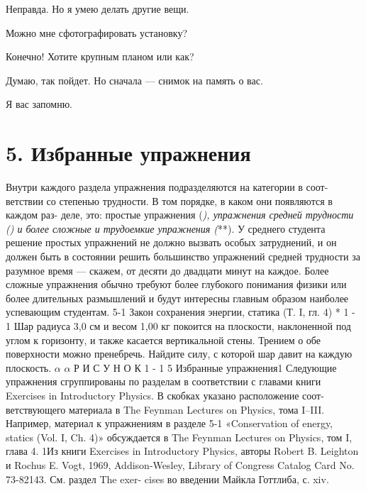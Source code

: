 \documentclass[11pt,oneside]{article}
\begin{document}
Неправда. Но я умею делать другие вещи.\par

Можно мне сфотографировать установку?\par

Конечно! Хотите крупным планом или как?\par

Думаю, так пойдет. Но сначала --- снимок на память о вас.\par

Я вас запомню.\par

\clearpage


\section*{5. Избранные упражнения}



\label{tips-sec-13-5-избранные-упражнения}


Внутри каждого раздела упражнения подразделяются на категории в соот- ветствии со степенью трудности. В том порядке, в каком они появляются в каждом раз- деле, это: простые упражнения (\emph{), упражнения средней трудности (}\emph{) и более сложные и трудоемкие упражнения (}**). У среднего студента решение простых упражнений не должно вызвать особых затруднений, и он должен быть в состоянии решить большинство упражнений средней трудности за разумное время --- скажем, от десяти до двадцати минут на каждое. Более сложные упражнения обычно требуют более глубокого понимания физики или более длительных размышлений и будут интересны главным образом наиболее успевающим студентам. 5-1 Закон сохранения энергии, статика (Т. I, гл. 4) * 1 - 1 Шар радиуса 3,0 см и весом 1,00 кг покоится на плоскости, наклоненной под углом к горизонту, и также касается вертикальной стены. Трением о обе поверхности можно пренебречь. Найдите силу, с которой шар давит на каждую плоскость. \(\alpha\) \(\alpha\) Р И С У Н О К  1 - 1 5 Избранные упражнения1 Следующие упражнения сгруппированы по разделам в соответствии с главами книги Exercises in Introductory Physics. В скобках указано расположение соот- ветствующего материала в The Feynman Lectures on Physics, тома I–III. Например, материал к упражнениям в разделе 5-1 «Conservation of energy, statics (Vol. I, Ch. 4)» обсуждается в The Feynman Lectures on Physics, том I, глава 4. 1Из книги Exercises in Introductory Physics, авторы Robert B. Leighton и Rochus E. Vogt, 1969, Addison-Wesley, Library of Congress Catalog Card No. 73-82143. См. раздел The exer- cises во введении Майкла Готтлиба, с. xiv.\par
\end{document}

